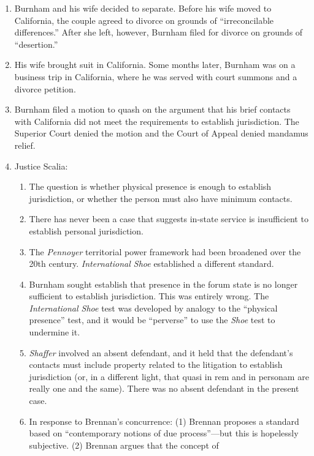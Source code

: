 \begin{enumerate}
    \item Burnham and his wife decided to separate. Before his wife moved to 
    California, the couple agreed to divorce on grounds of ``irreconcilable 
    differences.'' After she left, however, Burnham filed for divorce on 
    grounds of ``desertion.''
    \item His wife brought suit in California. Some months later, Burnham was 
    on a business trip in California, where he was served with court summons 
    and a divorce petition.
    \item Burnham filed a motion to quash on the argument that his brief 
    contacts with California did not meet the requirements to establish 
    jurisdiction. The Superior Court denied the motion and the Court of Appeal 
    denied mandamus relief.
    \item Justice Scalia:
    \begin{enumerate}
        \item The question is whether physical presence is enough to establish 
        jurisdiction, or whether the person must also have minimum contacts.
        \item There has never been a case that suggests in-state service is 
        insufficient to establish personal jurisdiction.
        \item The \emph{Pennoyer} territorial power framework had been 
        broadened over the 20th century. \emph{International Shoe} established 
        a different standard.
        \item Burnham sought establish that presence in the forum state is no 
        longer sufficient to establish jurisdiction. This was entirely wrong. 
        The \emph{International Shoe} test was developed by analogy to the 
        ``physical presence'' test, and it would be ``perverse'' to use the 
        \emph{Shoe} test to undermine it.
        \item \emph{Shaffer} involved an absent defendant, and it held that 
        the defendant's contacts must include property related to the 
        litigation to establish jurisdiction (or, in a different light, that 
        quasi in rem and in personam are really one and the same). There was 
        no absent defendant in the present case.
        \item In response to Brennan's concurrence: (1) Brennan proposes a 
        standard based on ``contemporary notions of due process''---but this 
        is hopelessly subjective. (2) Brennan argues that the concept of 

\end{enumerate}
\end{enumerate}
